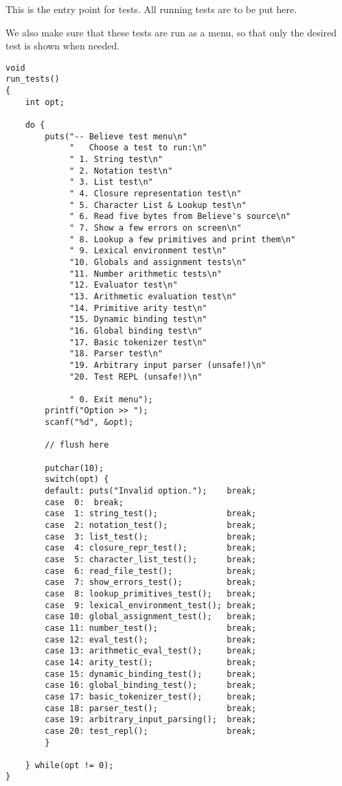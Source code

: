 \documentclass[openright,a4paper,twoside,12pt]{memoir}
\begin{document}
This is the entry point for tests. All running tests are to be put
here.

We also make sure that these tests are run as a menu, so that only the
desired test is shown when needed.

\begin{verbatim}
void
run_tests()
{
    int opt;

    do {
        puts("-- Believe test menu\n"
             "   Choose a test to run:\n"
             " 1. String test\n"
             " 2. Notation test\n"
             " 3. List test\n"
             " 4. Closure representation test\n"
             " 5. Character List & Lookup test\n"
             " 6. Read five bytes from Believe's source\n"
             " 7. Show a few errors on screen\n"
             " 8. Lookup a few primitives and print them\n"
             " 9. Lexical environment test\n"
             "10. Globals and assignment tests\n"
             "11. Number arithmetic tests\n"
             "12. Evaluator test\n"
             "13. Arithmetic evaluation test\n"
             "14. Primitive arity test\n"
             "15. Dynamic binding test\n"
             "16. Global binding test\n"
             "17. Basic tokenizer test\n"
             "18. Parser test\n"
             "19. Arbitrary input parser (unsafe!)\n"
             "20. Test REPL (unsafe!)\n"
             
             " 0. Exit menu");
        printf("Option >> ");
        scanf("%d", &opt);

        // flush here

        putchar(10);
        switch(opt) {
        default: puts("Invalid option.");    break;
        case  0:  break;
        case  1: string_test();              break;
        case  2: notation_test();            break;
        case  3: list_test();                break;
        case  4: closure_repr_test();        break;
        case  5: character_list_test();      break;
        case  6: read_file_test();           break;
        case  7: show_errors_test();         break;
        case  8: lookup_primitives_test();   break;
        case  9: lexical_environment_test(); break;
        case 10: global_assignment_test();   break;
        case 11: number_test();              break;
        case 12: eval_test();                break;
        case 13: arithmetic_eval_test();     break;
        case 14: arity_test();               break;
        case 15: dynamic_binding_test();     break;
        case 16: global_binding_test();      break;
        case 17: basic_tokenizer_test();     break;
        case 18: parser_test();              break;
        case 19: arbitrary_input_parsing();  break;
        case 20: test_repl();                break;
        }
        
    } while(opt != 0);
}
\end{verbatim}
\end{document}

